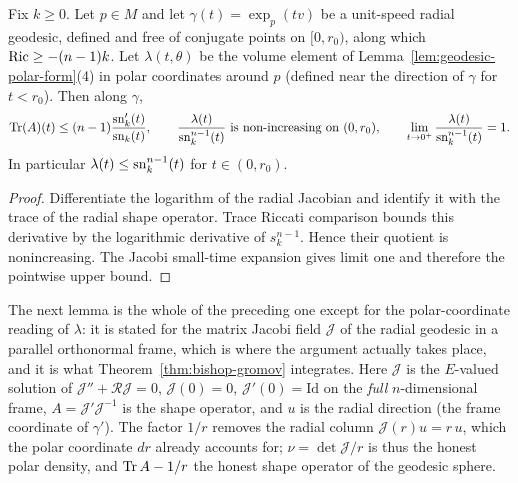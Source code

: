 \begin{lemma}
\label{lem:volume-element-comparison}

Fix $k\ge0$. Let $p\in M$ and let $\gamma(t)=\exp_p(tv)$ be a
unit-speed radial geodesic, defined and free of conjugate points on
$[0,r_0)$, along which $\operatorname{Ric}\ge-(n-1)k$. Let $\lambda(t,\theta)$ be
the volume element of Lemma~\ref{lem:geodesic-polar-form}(4) in
polar coordinates around $p$ (defined near the direction of
$\gamma$ for $t<r_0$). Then along $\gamma$,
$$\operatorname{Tr}(A)(t)\le(n-1)\frac{\operatorname{sn}_k'(t)}{\operatorname{sn}_k(t)},\qquad
\frac{\lambda(t)}{\operatorname{sn}_k^{n-1}(t)}\ \text{is non-increasing on
}(0,r_0),\qquad \lim_{t\to0^+}\frac{\lambda(t)}{\operatorname{sn}_k^{n-1}(t)}=1.$$
In particular $\lambda(t)\le\operatorname{sn}_k^{n-1}(t)$ for $t\in(0,r_0)$.
\end{lemma}

\begin{proof}
\sketch
{}
Differentiate the logarithm of the radial Jacobian and identify it with the trace of the radial shape operator. Trace Riccati comparison bounds this derivative by the logarithmic derivative of $s_k^{n-1}$. Hence their quotient is nonincreasing. The Jacobi small-time expansion gives limit one and therefore the pointwise upper bound.
\end{proof}

The next lemma is the whole of the preceding one except for the
polar-coordinate reading of $\lambda$: it is stated for the matrix Jacobi
field $\mathcal J$ of the radial geodesic in a parallel orthonormal frame,
which is where the argument actually takes place, and it is what
Theorem~\ref{thm:bishop-gromov} integrates. Here $\mathcal J$ is the
$E$-valued solution of $\mathcal J''+\mathcal R\mathcal J=0$,
$\mathcal J(0)=0$, $\mathcal J'(0)=\mathrm{Id}$ on the \emph{full}
$n$-dimensional frame, $A=\mathcal J'\mathcal J^{-1}$ is the shape operator,
and $u$ is the radial direction (the frame coordinate of $\gamma'$). The
factor $1/r$ removes the radial column $\mathcal J(r)u=r\,u$, which the polar
coordinate $dr$ already accounts for; $\nu=\det\mathcal J/r$ is thus the
honest polar density, and $\operatorname{Tr} A-1/r$ the honest shape operator of the
geodesic sphere.

